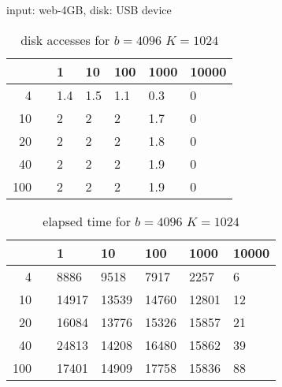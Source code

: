 \documentclass{article}
\begin{document}
\newcommand{\D}[0]{\hphantom{0}}
input: web-4GB, disk: USB device

\begin{table}[ht]
\begin{center}
\begin{tabular}{rllllll}
  \hline
   &  & 1 & 10 & 100 & 1000 & 10000 \\ 
     \hline
	 \D\D4 &  & 1.4 & 1.5 & 1.1 & 0.3 & 0 \\ 
	   \D10 &  & 2 & 2 & 2 & 1.7 & 0 \\ 
	     \D20 &  & 2 & 2 & 2 & 1.8 & 0 \\ 
		   \D40 &  & 2 & 2 & 2 & 1.9 & 0 \\ 
		     100 &  & 2 & 2 & 2 & 1.9 & 0 \\ 
			    \hline
				\end{tabular}
				\caption{disk accesses for $b= 4096 $ $K= 1024 $}
				\end{center}
				\end{table}
				\begin{table}[ht]
				\begin{center}
				\begin{tabular}{rllllll}
				  \hline
				   &  & 1 & 10 & 100 & 1000 & 10000 \\ 
				     \hline
					 \D\D4 &  & \D8886 & \D9518 & \D7917 & \D2257 & \D\D\D\D6 \\ 
					   \D10 &  & 14917 & 13539 & 14760 & 12801 & \D\D\D12 \\ 
					     \D20 &  & 16084 & 13776 & 15326 & 15857 & \D\D\D21 \\ 
						   \D40 &  & 24813 & 14208 & 16480 & 15862 & \D\D\D39 \\ 
						     100 &  & 17401 & 14909 & 17758 & 15836 & \D\D\D88 \\ 
							    \hline
								\end{tabular}
								\caption{elapsed time for  $b= 4096 $ $K= 1024 $}
								\end{center}
								\end{table}
\end{document}
